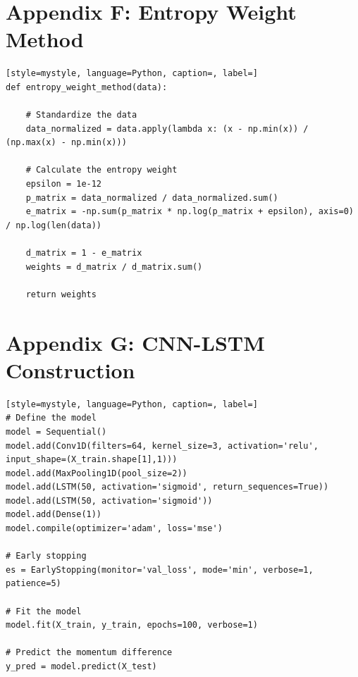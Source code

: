 \documentclass[12pt]{article}
\begin{document}
\section*{Appendix F: Entropy Weight Method}
\begin{lstlisting}[style=mystyle, language=Python, caption=, label=]
def entropy_weight_method(data):
    
    # Standardize the data
    data_normalized = data.apply(lambda x: (x - np.min(x)) / (np.max(x) - np.min(x)))
    
    # Calculate the entropy weight
    epsilon = 1e-12
    p_matrix = data_normalized / data_normalized.sum()
    e_matrix = -np.sum(p_matrix * np.log(p_matrix + epsilon), axis=0) / np.log(len(data))
    
    d_matrix = 1 - e_matrix
    weights = d_matrix / d_matrix.sum()
    
    return weights
\end{lstlisting}

\section*{Appendix G: CNN-LSTM Construction}
\begin{lstlisting}[style=mystyle, language=Python, caption=, label=]
# Define the model
model = Sequential()
model.add(Conv1D(filters=64, kernel_size=3, activation='relu', input_shape=(X_train.shape[1],1)))
model.add(MaxPooling1D(pool_size=2))
model.add(LSTM(50, activation='sigmoid', return_sequences=True))
model.add(LSTM(50, activation='sigmoid'))
model.add(Dense(1))
model.compile(optimizer='adam', loss='mse')

# Early stopping
es = EarlyStopping(monitor='val_loss', mode='min', verbose=1, patience=5)

# Fit the model
model.fit(X_train, y_train, epochs=100, verbose=1)

# Predict the momentum difference
y_pred = model.predict(X_test)
\end{lstlisting}
\end{document}
